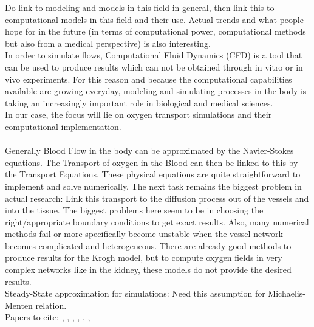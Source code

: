 Do link to modeling and models in this field in general, then link this to computational models in this field and their use. Actual trends and what people hope for in the future (in terms of computational power, computational methods but also from a medical perspective) is also interesting.
\\In order to simulate flows, Computational Fluid Dynamics (CFD) is a tool that can be used to produce results which can not be obtained through in vitro or in vivo experiments. For this reason and because the computational capabilities available are growing everyday, modeling and simulating processes in the body is taking an increasingly important role in biological and medical sciences.
\\In our case, the focus will lie on oxygen transport simulations and their computational implementation.\\
\\Generally Blood Flow in the body can be approximated by the Navier-Stokes equations. The Transport of oxygen in the Blood can then be linked to this by the Transport Equations. These physical equations are quite straightforward to implement and solve numerically. The next task remains the biggest problem in actual research: Link this transport to the diffusion process out of the vessels and into the tissue. The biggest problems here seem to be in choosing the right/appropriate boundary conditions to get exact results. Also, many numerical methods fail or more specifically become unstable when the vessel network becomes complicated and heterogeneous. There are already good methods to produce results for the Krogh model, but to compute oxygen fields in very complex networks like in the kidney, these models do not provide the desired results.
\\Steady-State approximation for simulations: Need this assumption for Michaelis-Menten relation.
\\Papers to cite: \cite{rahman2012mathematical}, \cite{goldman2001computational}, \cite{kuzmin2010guide}, \cite{lee2017accounting}, \cite{hoofd1992updating}, \cite{beard2001modeling}, \cite{Secomb2004}


